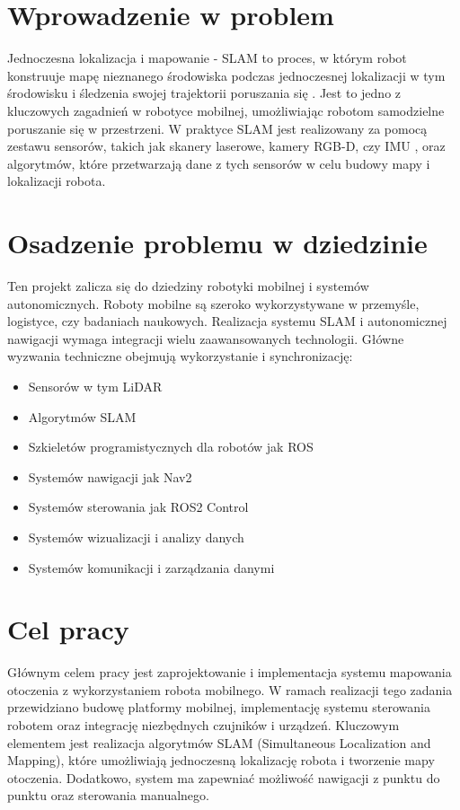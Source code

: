 \documentclass[a4paper,twoside,12pt]{book}
\begin{document}
\section{Wprowadzenie w problem} 
Jednoczesna lokalizacja i mapowanie - SLAM to proces, w którym robot konstruuje mapę nieznanego środowiska podczas jednoczesnej lokalizacji w tym środowisku i śledzenia swojej trajektorii poruszania się \cite{bib:mediumslam}. Jest to jedno z kluczowych zagadnień w robotyce mobilnej, umożliwiając robotom samodzielne poruszanie się w przestrzeni. W praktyce SLAM jest realizowany za pomocą zestawu sensorów, takich jak skanery laserowe, kamery RGB-D, czy IMU , oraz algorytmów, które przetwarzają dane z tych sensorów w celu budowy mapy i lokalizacji robota.
\newpage
\section{Osadzenie problemu w dziedzinie}
Ten projekt zalicza się do dziedziny robotyki mobilnej i systemów autonomicznych. Roboty mobilne są szeroko wykorzystywane w przemyśle, logistyce, czy badaniach naukowych.
Realizacja systemu SLAM i autonomicznej nawigacji wymaga integracji wielu zaawansowanych technologii. Główne wyzwania techniczne obejmują wykorzystanie i synchronizację:
\begin{itemize}
\item Sensorów w tym LiDAR 
\item Algorytmów SLAM 
\item Szkieletów programistycznych dla robotów jak ROS
\item Systemów nawigacji jak Nav2
\item Systemów sterowania jak ROS2 Control
\item Systemów wizualizacji i analizy danych
\item Systemów komunikacji i zarządzania danymi
\end{itemize}

\section{Cel pracy}
Głównym celem pracy jest zaprojektowanie i implementacja systemu mapowania otoczenia z wykorzystaniem robota mobilnego. W ramach realizacji tego zadania przewidziano budowę platformy mobilnej, implementację systemu sterowania robotem oraz integrację niezbędnych czujników i urządzeń. Kluczowym elementem jest realizacja algorytmów SLAM (Simultaneous Localization and Mapping), które umożliwiają jednoczesną lokalizację robota i tworzenie mapy otoczenia. Dodatkowo, system ma zapewniać możliwość nawigacji z punktu do punktu oraz sterowania manualnego.
\end{document}
